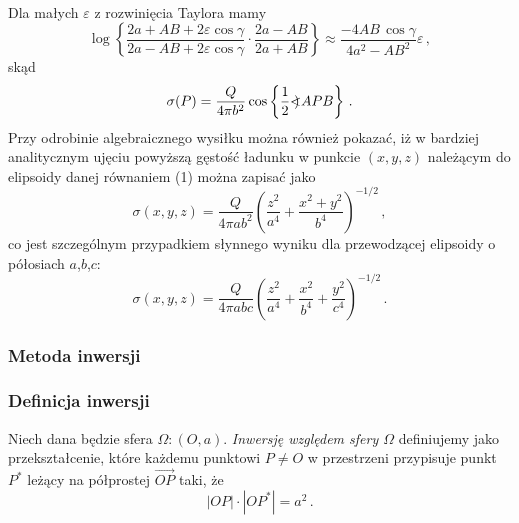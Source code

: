 \documentclass[../main.tex]{subfiles}
\begin{document}
\begin{enumerate}
\begin{equation*}
\begin{split}
\end{split}
\end{equation*}
Dla małych \(\varepsilon\) z rozwinięcia Taylora mamy
\begin{equation*}
    \log\left\{\frac{2a+AB+2\varepsilon\cos\gamma}{2a-AB+2\varepsilon\cos\gamma}\cdot\frac{2a-AB}{2a+AB}\right\}\approx \frac{-4AB\,\cos\gamma}{4a^2-AB^2}\varepsilon\,,
\end{equation*}
skąd
\begin{equation*}
    \sigma(P)=\frac{Q}{4\pi b^2}\cos\left\{\frac{1}{2}\mathord{<\mspace{-9mu}\mathrel{)}\mspace{2mu}} APB\right\}\,.
\end{equation*}
Przy odrobinie algebraicznego wysiłku można również pokazać, iż w bardziej analitycznym ujęciu powyższą gęstość ładunku w punkcie \((x,y,z)\) należącym do elipsoidy danej równaniem (1) można zapisać jako
\begin{equation*}
    \sigma(x,y,z)=\frac{Q}{4\pi ab^2}\left(\frac{z^2}{a^4}+\frac{x^2+y^2}{b^4}\right)^{-1/2}\,,
\end{equation*}
co jest szczególnym przypadkiem słynnego wyniku dla przewodzącej elipsoidy o półosiach \(a\),\(b\),\(c\):
\begin{equation*}
    \sigma(x,y,z)=\frac{Q}{4\pi abc}\left(\frac{z^2}{a^4}+\frac{x^2}{b^4}+\frac{y^2}{c^4}\right)^{-1/2}\,.
\end{equation*}
\end{enumerate}

\subsubsection{Metoda inwersji}
\subsubsection*{Definicja inwersji}
Niech dana będzie sfera \(\Omega:(O,a)\). \textit{Inwersję względem sfery \(\Omega\)} definiujemy jako przekształcenie, które każdemu punktowi \(P\neq O\) w przestrzeni przypisuje punkt \(P^*\) leżący na półprostej \(\overrightarrow{OP}\) taki, że
\begin{equation*}
    |OP|\cdot|OP^*|=a^2\,.
\end{equation*}
\end{document}
